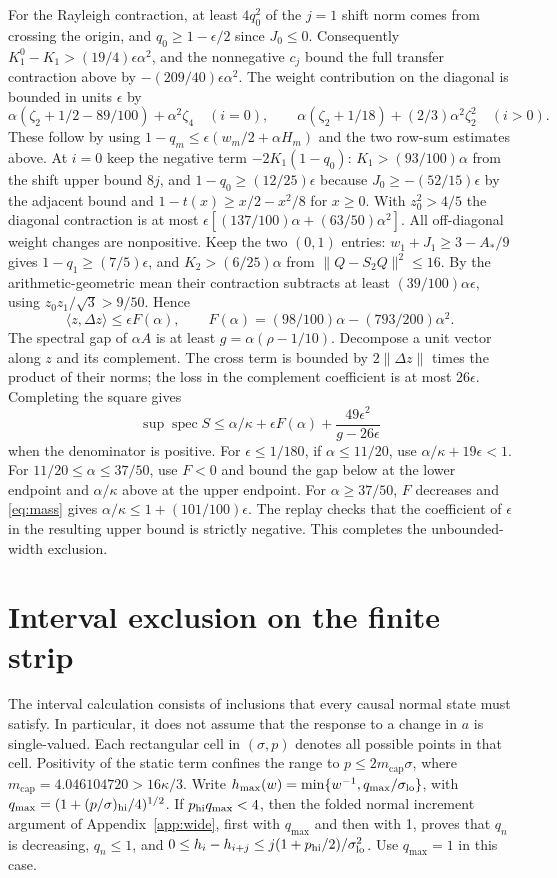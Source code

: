 \documentclass[11pt]{article}
\newcommand{\spec}{\operatorname{spec}}
\begin{document}
For the Rayleigh contraction, at least $4q_0^2$ of the $j=1$ shift norm comes from crossing the origin, and $q_0\ge1-\epsilon/2$ since $J_0\le0$. Consequently $K_1^0-K_1>(19/4)\epsilon\alpha^2$, and the nonnegative $c_j$ bound the full transfer contraction above by $-(209/40)\epsilon\alpha^2$. The weight contribution on the diagonal is bounded in units $\epsilon$ by
\[
 \alpha(\zeta_2+1/2-89/100)+\alpha^2\zeta_4\quad (i=0),\qquad
 \alpha(\zeta_2+1/18)+(2/3)\alpha^2\zeta_2^2\quad (i>0).
\]
These follow by using $1-q_m\le\epsilon(w_m/2+\alpha H_m)$ and the two row-sum estimates above. At $i=0$ keep the negative term $-2K_1(1-q_0)$: $K_1>(93/100)\alpha$ from the shift upper bound $8j$, and $1-q_0\ge(12/25)\epsilon$ because $J_0\ge-(52/15)\epsilon$ by the adjacent bound and $1-t(x)\ge x/2-x^2/8$ for $x\ge0$. With $z_0^2>4/5$ the diagonal contraction is at most $\epsilon[(137/100)\alpha+(63/50)\alpha^2]$. All off-diagonal weight changes are nonpositive. Keep the two $(0,1)$ entries: $w_1+J_1\ge3-A_*/9$ gives $1-q_1\ge(7/5)\epsilon$, and $K_2>(6/25)\alpha$ from $\|Q-S_2Q\|^2\le16$. By the arithmetic-geometric mean their contraction subtracts at least $(39/100)\alpha\epsilon$, using $z_0z_1/\sqrt3>9/50$. Hence
\[
 \langle z,\Delta z\rangle\le\epsilon F(\alpha),\qquad F(\alpha)=(98/100)\alpha-(793/200)\alpha^2.
\]
The spectral gap of $\alpha A$ is at least $g=\alpha(\rho-1/10)$. Decompose a unit vector along $z$ and its complement. The cross term is bounded by $2\|\Delta z\|$ times the product of their norms; the loss in the complement coefficient is at most $26\epsilon$. Completing the square gives
\[
 \sup\spec S\le \alpha/\kappa+\epsilon F(\alpha)+\frac{49\epsilon^2}{g-26\epsilon}
\]
when the denominator is positive. For $\epsilon\le1/180$, if $\alpha\le11/20$, use $\alpha/\kappa+19\epsilon<1$. For $11/20\le\alpha\le37/50$, use $F<0$ and bound the gap below at the lower endpoint and $\alpha/\kappa$ above at the upper endpoint. For $\alpha\ge37/50$, $F$ decreases and \eqref{eq:mass} gives $\alpha/\kappa\le1+(101/100)\epsilon$. The replay checks that the coefficient of $\epsilon$ in the resulting upper bound is strictly negative. This completes the unbounded-width exclusion.

\section{Interval exclusion on the finite strip}\label{app:cover}
The interval calculation consists of inclusions that every causal normal state must satisfy. In particular, it does not assume that the response to a change in $a$ is single-valued. Each rectangular cell in $(\sigma,p)$ denotes all possible points in that cell. Positivity of the static term confines the range to $p\le2m_{\mathrm{cap}}\sigma$, where $m_{\mathrm{cap}}=4.046104720>16\kappa/3$. Write $h_{\max}(w)=\min\{w^{-1},q_{\max}/\sigma_{\rm lo}\}$, with $q_{\max}=(1+(p/\sigma)_{\rm hi}/4)^{1/2}$. If $p_{\rm hi}q_{\max}<4$, then the folded normal increment argument of Appendix~\ref{app:wide}, first with $q_{\max}$ and then with 1, proves that $q_n$ is decreasing, $q_n\le1$, and $0\le h_i-h_{i+j}\le j(1+p_{\rm hi}/2)/\sigma_{\rm lo}^2$. Use $q_{\max}=1$ in this case.
\end{document}
